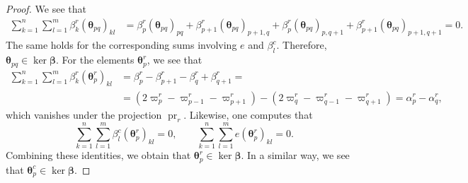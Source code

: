\documentclass[11pt]{article}
\newcommand{\bbeta}{\boldsymbol{\beta}}
\newcommand{\btheta}{{\boldsymbol{\theta}}}
\DeclareMathOperator{\pr}{pr}
\theoremstyle{definition}\newtheorem{definition}[theorem]{Definition}
\theoremstyle{definition}\newtheorem{remark}[theorem]{Remark}
\theoremstyle{remark}
\numberwithin{equation}{section}
\begin{document}
\begin{proof}
    We see that
    \begin{equation*}\begin{split}
        \sum_{k=1}^{n}\sum_{l=1}^m \beta_{k}^r (\btheta_{pq})_{kl} &= \beta_{p}^r (\btheta_{pq})_{pq} +  \beta_{p+1}^r (\btheta_{pq})_{p+1,q} + \beta_{p}^r (\btheta_{pq})_{p,q+1} + \beta_{p+1}^r (\btheta_{pq})_{p+1,q+1} = 0.
        \end{split}
    \end{equation*}
    The same holds for the corresponding sums involving $e$ and $\beta_l^c$. Therefore, $\btheta_{pq} \in \ker \bbeta$. For the elements $\btheta_p^r$, we see that
    \begin{equation*}\begin{split}
        \sum_{k=1}^n \sum_{l=1}^m \beta_{k}^r (\btheta_{p}^r)_{kl} &= \beta_{p}^r - \beta_{p+1}^r - \beta_{q}^r + \beta_{q+1}^r = \\ &= (2\varpi_p^r - \varpi_{p-1}^r - \varpi_{p+1}^r) - (2\varpi_q^r - \varpi_{q-1}^r - \varpi_{q+1}^r) = \alpha_p^r - \alpha_q^r,
        \end{split}
    \end{equation*}
    which vanishes under the projection $\pr_r$.
    Likewise, one computes that 
    \begin{equation*}
        \sum_{k=1}^n \sum_{l=1}^m \beta_{l}^c (\btheta_p^r)_{kl} = 0, \qquad \sum_{k=1}^n \sum_{l=1}^m e (\btheta_p^r)_{kl} = 0.
    \end{equation*}
    Combining these identities, we obtain that $\btheta_p^r \in \ker \bbeta$. In a similar way, we see that $\btheta_p^c \in \ker \bbeta$.
\end{proof}
\end{document}
